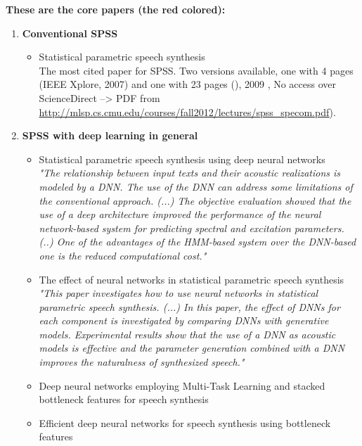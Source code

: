 \textbf{These are the core papers (the red colored):}
\begin{enumerate}[leftmargin=16pt]
	\item \textbf{Conventional \ac{SPSS}}
	\begin{itemize}[leftmargin=10pt]
		\item \textcolor{ACMRed}{Statistical parametric speech synthesis} \cite{zen:statistical}\\
		The most cited paper for \ac{SPSS}. Two versions available, one with 4 pages (IEEE Xplore, 2007) and one with 23 pages ()\cite{zen:statistical}, 2009 , No access over ScienceDirect --> PDF from \url{http://mlsp.cs.cmu.edu/courses/fall2012/lectures/spss_specom.pdf}).
	\end{itemize}
	\vspace{1em}
	\item \textbf{\ac{SPSS} with deep learning in general}
	\begin{itemize}[leftmargin=10pt]
		\item \textcolor{ACMRed}{Statistical parametric speech synthesis using deep neural networks} \cite{zen:deepstatistical}\\
		\textit{"The relationship between input texts and their acoustic realizations is modeled by a DNN. The use of the DNN can address some limitations of the conventional approach. (...) The objective evaluation showed that the use of a deep architecture improved the performance of the neural network-based system for predicting spectral and excitation parameters. (..) One of the advantages of the HMM-based system over the DNN-based one is the reduced computational cost."}
		\item \textcolor{ACMRed}{The effect of neural networks in statistical parametric speech synthesis} \cite{hashimoto:effect}\\
		\textit{"This paper investigates how to use neural networks in statistical parametric speech synthesis. (...) In this paper, the effect of DNNs for each component is investigated by comparing DNNs with generative models. Experimental results show that the use of a DNN as acoustic models is effective and the parameter generation combined with a DNN improves the naturalness of synthesized speech."}
		\item \textcolor{black!40}{Deep neural networks employing Multi-Task Learning and stacked bottleneck features for speech synthesis \cite{wu:deep}}
		\item \textcolor{black!40}{Efficient deep neural networks for speech synthesis using bottleneck features \cite{joo:efficient}}

\end{itemize}
\end{enumerate}
